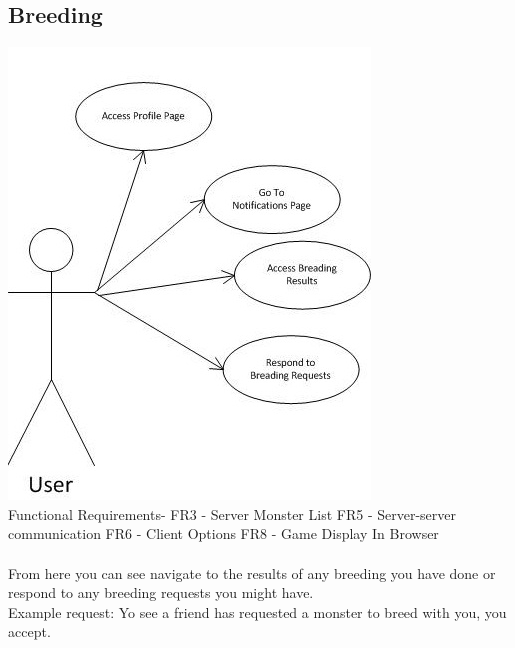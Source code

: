 \documentclass{project}
\begin{document}
\subsection{Breeding}
\includegraphics[scale=0.6]{BreedingPageUseCase.jpg}
\\
Functional Requirements-
FR3 - Server Monster List
FR5 - Server-server communication
FR6 - Client Options
FR8 - Game Display In Browser
\\
\\
From here you can see navigate to the results of any breeding you have done or respond to any breeding
requests you might have.
\\
Example request: Yo see a friend has requested a monster to breed with you, you accept.

\newpage
\end{document}
